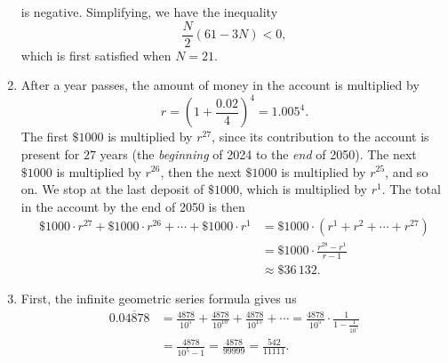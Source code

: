 \begin{enumerate}
\begin{equation*}
\end{equation*}
is negative. Simplifying, we have the inequality
\begin{equation*}
\frac{N}{2}(61 - 3N) < 0,
\end{equation*}
which is first satisfied when $N = \boxed{21}$.
\item After a year passes, the amount of money in the account is multiplied by
\begin{equation*}
r = \left(1 + \frac{0.02}{4}\right)^4 = 1.005^4.
\end{equation*}
The first $\$1000$ is multiplied by $r^{27}$, since its contribution to the account is present for $27$ years (the \emph{beginning} of 2024 to the \emph{end} of 2050). The next $\$1000$ is multiplied by $r^{26}$, then the next $\$1000$ is multiplied by $r^{25}$, and so on. We stop at the last deposit of $\$1000$, which is multiplied by $r^1$. The total in the account by the end of 2050 is then 
\begin{align*} 
\$1000\cdot r^{27} + \$1000\cdot r^{26} + \cdots + \$1000\cdot r^1 &= \$1000\cdot (r^1 + r^2 + \cdots + r^{27}) \\
&= \$1000\cdot\frac{r^{28} - r^1}{r - 1} \\
&\approx \$36\,132.
\end{align*} 
\item First, the infinite geometric series formula gives us 
\begin{align*}
0.\overline{04878} &= \frac{4878}{10^5} + \frac{4878}{10^{10}} + \frac{4878}{10^{15}} + \cdots = \frac{4878}{10^5}\cdot\frac{1}{1 - \tfrac{1}{10^5}} \\
&= \frac{4878}{10^5 - 1} = \frac{4878}{99999} = \frac{542}{11111}.
\end{align*}
\end{enumerate}